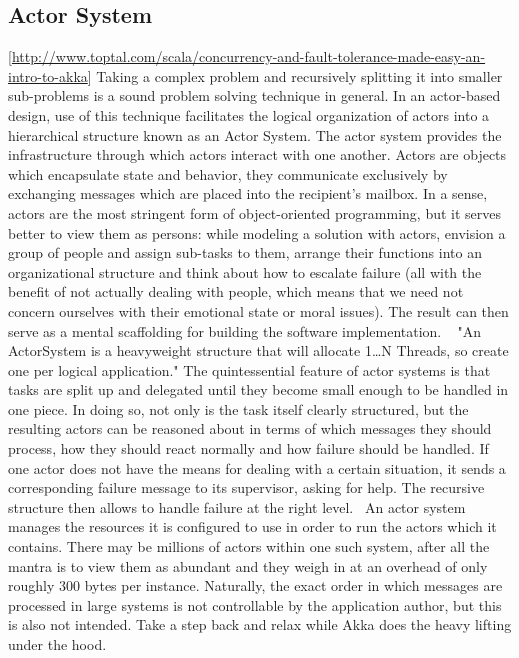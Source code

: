   \subsection{Actor System}[\url{http://www.toptal.com/scala/concurrency-and-fault-tolerance-made-easy-an-intro-to-akka}]
  Taking a complex problem and recursively splitting it into smaller sub-problems is a sound problem solving technique in general. In an actor-based design, use of this technique facilitates the logical organization of actors into a hierarchical structure known as an Actor System. The actor system provides the infrastructure through which actors interact with one another.
  Actors are objects which encapsulate state and behavior, they communicate exclusively by exchanging messages which are placed into the recipient’s mailbox. In a sense, actors are the most stringent form of object-oriented programming, but it serves better to view them as persons: while modeling a solution with actors, envision a group of people and assign sub-tasks to them, arrange their functions into an organizational structure and think about how to escalate failure (all with the benefit of not actually dealing with people, which means that we need not concern ourselves with their emotional state or moral issues). The result can then serve as a mental scaffolding for building the software implementation. ~\parencite{akkaJavaDoc}
  "An ActorSystem is a heavyweight structure that will allocate 1…N Threads, so create one per logical application."
  The quintessential feature of actor systems is that tasks are split up and delegated until they become small enough to be handled in one piece. In doing so, not only is the task itself clearly structured, but the resulting actors can be reasoned about in terms of which messages they should process, how they should react normally and how failure should be handled. If one actor does not have the means for dealing with a certain situation, it sends a corresponding failure message to its supervisor, asking for help. The recursive structure then allows to handle failure at the right level.~\parencite{akkaJavaDoc}
  An actor system manages the resources it is configured to use in order to run the actors which it contains. There may be millions of actors within one such system, after all the mantra is to view them as abundant and they weigh in at an overhead of only roughly 300 bytes per instance. Naturally, the exact order in which messages are processed in large systems is not controllable by the application author, but this is also not intended. Take a step back and relax while Akka does the heavy lifting under the hood.~\parencite{akkaJavaDoc}

